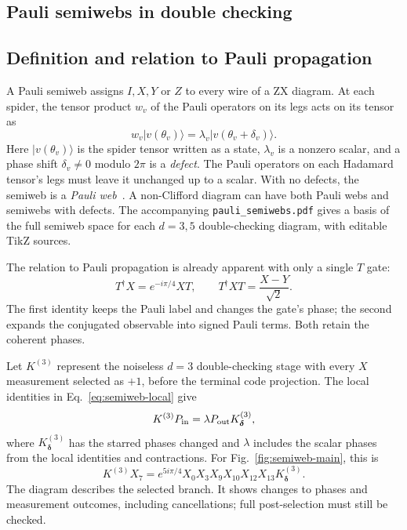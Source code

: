 \begin{semiwebaddition}
\section{Pauli semiwebs in double checking}
\label{app:semiwebs}

\subsection{Definition and relation to Pauli propagation}
A Pauli semiweb assigns $I,X,Y$ or $Z$ to every wire of a ZX diagram.
At each spider, the tensor product $w_v$ of the Pauli operators on its legs acts on its tensor as
\begin{equation}
 w_v|v(\theta_v)\rangle=\lambda_v|v(\theta_v+\delta_v)\rangle.
 \label{eq:semiweb-local}
\end{equation}
Here $|v(\theta_v)\rangle$ is the spider tensor written as a state,
$\lambda_v$ is a nonzero scalar, and a phase shift $\delta_v\ne0$
modulo $2\pi$ is a \emph{defect}. The Pauli operators on each Hadamard tensor's legs must leave it unchanged
up to a scalar. With no defects, the semiweb is a \emph{Pauli web}~\cite{zxflow}.
A non-Clifford diagram can have both Pauli webs and semiwebs with defects.
The accompanying \texttt{pauli\_semiwebs.pdf} gives a basis of the full
semiweb space for each $d=3,5$ double-checking diagram, with editable TikZ sources.

The relation to Pauli propagation is already apparent with only a single $T$ gate:
\begin{equation}
 T^\dagger X=e^{-i\pi/4}XT,
 \qquad T^\dagger XT=\frac{X-Y}{\sqrt2}.
 \label{eq:semiweb-T}
\end{equation}
The first identity keeps the Pauli label and changes the gate's phase;
the second expands the conjugated observable into signed Pauli terms.
Both retain the coherent phases.

Let $K^{(3)}$ represent the noiseless $d=3$ double-checking stage with every $X$
measurement selected as $+1$, before the terminal code projection.
The local identities in Eq.~\eqref{eq:semiweb-local} give
\begin{equation}
 K^{(3)} P_{\rm in}=\lambda P_{\rm out}K^{(3)}_{\boldsymbol\delta},
 \label{eq:semiweb-global}
\end{equation}
where $K^{(3)}_{\boldsymbol\delta}$ has the starred phases changed and $\lambda$
includes the scalar phases from the local identities and contractions.
For Fig.~\ref{fig:semiweb-main}, this is
\begin{equation}
 K^{(3)}X_7=e^{5i\pi/4}X_0X_3X_9X_{10}X_{12}X_{13}K^{(3)}_{\boldsymbol\delta}.
 \label{eq:semiweb-X7}
\end{equation}
The diagram describes the selected branch. It shows changes to phases and measurement outcomes, including cancellations;
full post-selection must still be checked.


\end{semiwebaddition}
